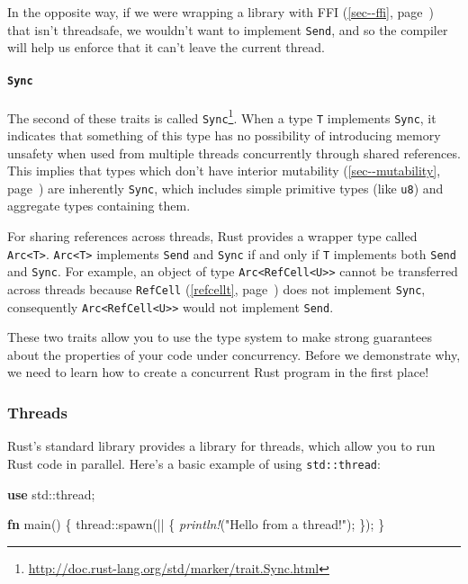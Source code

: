\documentclass[a4paper,]{book}
\renewcommand*{\hyperlink}[2]{%
 #2 (\autoref{#1}, page~\pageref{#1})}
\newenvironment{Shaded}{\begin{snugshade}}{\end{snugshade}}
\newcommand{\KeywordTok}[1]{\textcolor[rgb]{0.13,0.29,0.53}{\textbf{{#1}}}}
\newcommand{\StringTok}[1]{\textcolor[rgb]{0.31,0.60,0.02}{{#1}}}
\newcommand{\PreprocessorTok}[1]{\textcolor[rgb]{0.56,0.35,0.01}{\textit{{#1}}}}
\newcommand{\NormalTok}[1]{{#1}}
\renewcommand{\href}[2]{#2\footnote{\url{#1}}}
\let\oldparagraph\paragraph
\renewcommand{\paragraph}[1]{\oldparagraph{#1}\mbox{}}
\begin{document}
In the opposite way, if we were wrapping a library with
\protect\hyperlink{sec--ffi}{FFI} that isn't threadsafe, we wouldn't
want to implement \texttt{Send}, and so the compiler will help us
enforce that it can't leave the current thread.

\paragraph{\texorpdfstring{\texttt{Sync}}{Sync}}\label{sync}

The second of these traits is called
\href{http://doc.rust-lang.org/std/marker/trait.Sync.html}{\texttt{Sync}}.
When a type \texttt{T} implements \texttt{Sync}, it indicates that
something of this type has no possibility of introducing memory unsafety
when used from multiple threads concurrently through shared references.
This implies that types which don't have
\protect\hyperlink{sec--mutability}{interior mutability} are inherently
\texttt{Sync}, which includes simple primitive types (like \texttt{u8})
and aggregate types containing them.

For sharing references across threads, Rust provides a wrapper type
called \texttt{Arc\textless{}T\textgreater{}}.
\texttt{Arc\textless{}T\textgreater{}} implements \texttt{Send} and
\texttt{Sync} if and only if \texttt{T} implements both \texttt{Send}
and \texttt{Sync}. For example, an object of type
\texttt{Arc\textless{}RefCell\textless{}U\textgreater{}\textgreater{}}
cannot be transferred across threads because
\protect\hyperlink{refcellt}{\texttt{RefCell}} does not implement
\texttt{Sync}, consequently
\texttt{Arc\textless{}RefCell\textless{}U\textgreater{}\textgreater{}}
would not implement \texttt{Send}.

These two traits allow you to use the type system to make strong
guarantees about the properties of your code under concurrency. Before
we demonstrate why, we need to learn how to create a concurrent Rust
program in the first place!

\subsubsection{Threads}\label{threads}

Rust's standard library provides a library for threads, which allow you
to run Rust code in parallel. Here's a basic example of using
\texttt{std::thread}:

\begin{Shaded}
\begin{Highlighting}[]
\KeywordTok{use} \NormalTok{std::thread;}

\KeywordTok{fn} \NormalTok{main() \{}
    \NormalTok{thread::spawn(|| \{}
        \PreprocessorTok{println!}\NormalTok{(}\StringTok{"Hello from a thread!"}\NormalTok{);}
    \NormalTok{\});}
\NormalTok{\}}
\end{Highlighting}
\end{Shaded}
\end{document}
